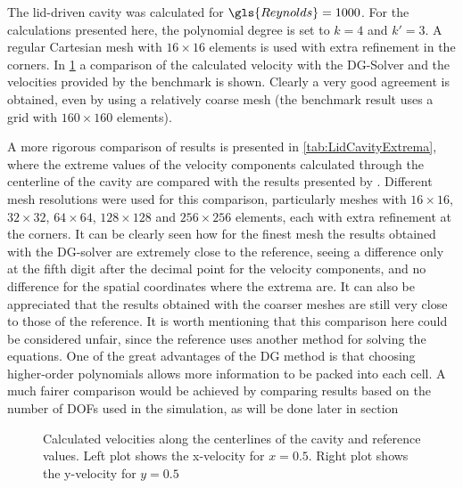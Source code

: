  The lid-driven cavity was calculated for $\gls{Reynolds} = 1000$. For the calculations presented here, the polynomial degree is set to $k = 4$ and $k' = 3$. A regular Cartesian mesh with $16\times16$ elements is used with extra refinement in the corners. In \cref{fig:LidVelocities} a comparison of the calculated velocity with the DG-Solver and the velocities provided by the benchmark is shown. Clearly a very good agreement is obtained, even by using a relatively coarse mesh (the benchmark result uses a grid with $160\times160$ elements).

A more rigorous comparison of results is presented in \cref{tab:LidCavityExtrema}, where the extreme values of the velocity components calculated through the centerline of the cavity are compared with the results presented by \cite{botellaBenchmarkSpectralResults1998}. Different mesh resolutions were used for this comparison, particularly meshes with $16\times16$, $32\times32$, $64\times64$, $128\times128$ and $256\times256$ elements, each with extra refinement at the corners. It can be clearly seen how for the finest mesh the results obtained with the DG-solver are extremely close to the reference, seeing a difference only at the fifth digit after the decimal point for the velocity components, and no difference for the spatial coordinates where the extrema are. It can also be appreciated that the results obtained with the coarser meshes are still very close to those of the reference. It is worth mentioning that this comparison here could be considered unfair, since the reference uses another method for solving the equations. One of the great advantages of the DG method is that choosing higher-order polynomials allows more information to be packed into each cell. A much fairer comparison would be achieved by comparing results based on the number of DOFs used in the simulation, as will be done later in section %

\newpage
\begin{figure}[tb]
	\caption{Calculated velocities along the centerlines of the cavity and reference values. Left plot shows the x-velocity for $x = 0.5$. Right plot shows the y-velocity for $y = 0.5$  }
	\label{fig:LidVelocities}
\end{figure}

